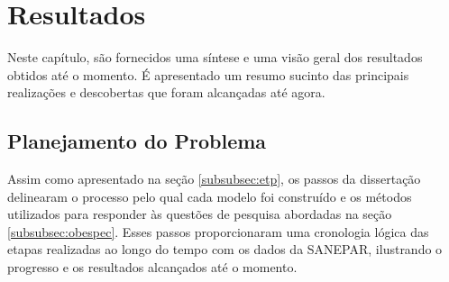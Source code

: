 \section{Resultados} \label{sec:result}

Neste capítulo, são fornecidos uma síntese e uma visão geral dos resultados obtidos até o momento. É apresentado um resumo sucinto das principais realizações e descobertas que foram alcançadas até agora.


\subsection{Planejamento do Problema} \label{subsec:planexp}

Assim como apresentado na seção \ref{subsubsec:etp}, os passos da dissertação delinearam o processo pelo qual cada modelo foi construído e os métodos utilizados para responder às questões de pesquisa abordadas na seção \ref{subsubsec:obespec}. Esses passos proporcionaram uma cronologia lógica das etapas realizadas ao longo do tempo com os dados da SANEPAR, ilustrando o progresso e os resultados alcançados até o momento.

















    
  
 
 

 
  
    

    
